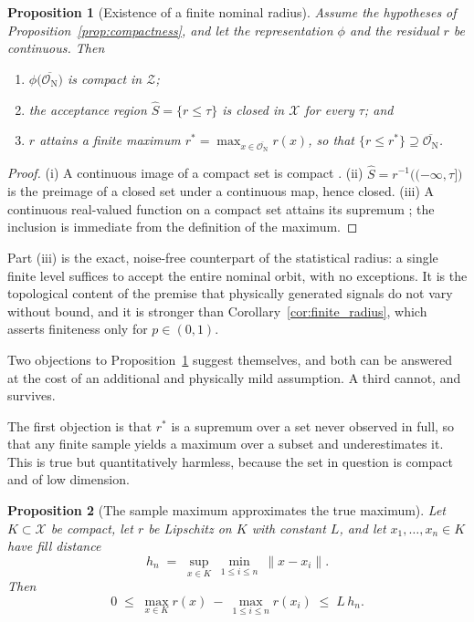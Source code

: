 \documentclass[a4paper]{cas-sc}
\newtheorem{proposition}{Proposition}
\newcommand{\X}{\ensuremath{\mathcal{X}}}
\newcommand{\Z}{\ensuremath{\mathcal{Z}}}
\newcommand{\residual}{\ensuremath{r}}
\begin{document}
\begin{proposition}[Existence of a finite nominal radius]
\label{prop:finite_nominal_radius}
Assume the hypotheses of Proposition~\ref{prop:compactness}, and let the
representation \(\phi\) and the residual \(\residual\) be continuous. Then
\begin{enumerate}[label=(\roman*),leftmargin=1.8em]
\item \(\phi\bigl(\overline{\mathcal{O}_{\mathrm N}}\bigr)\) is compact in
      \(\Z\);
\item the acceptance region \(\widehat{S}=\{\residual\le\tau\}\) is closed in
      \(\X\) for every \(\tau\); and
\item \(\residual\) attains a finite maximum
      \(\residual^{*}=\max_{x\in\overline{\mathcal{O}_{\mathrm N}}}\residual(x)\),
      so that \(\{\residual\le\residual^{*}\}\supseteq
      \overline{\mathcal{O}_{\mathrm N}}\).
\end{enumerate}
\end{proposition}

\begin{proof}
(i) A continuous image of a compact set is compact
\citep[Thm.~4.14]{rudin1976}. (ii) \(\widehat{S}=\residual^{-1}
\bigl((-\infty,\tau]\bigr)\) is the preimage of a closed set under a
continuous map, hence closed. (iii) A continuous real-valued function on a
compact set attains its supremum \citep[Thm.~4.16]{rudin1976}; the inclusion
is immediate from the definition of the maximum.
\end{proof}

Part (iii) is the exact, noise-free counterpart of the statistical radius: a
single finite level suffices to accept the entire nominal orbit, with no
exceptions. It is the topological content of the premise that physically
generated signals do not vary without bound, and it is stronger than
Corollary~\ref{cor:finite_radius}, which asserts finiteness only for
\(p\in(0,1)\).

Two objections to Proposition~\ref{prop:finite_nominal_radius} suggest
themselves, and both can be answered at the cost of an additional and
physically mild assumption. A third cannot, and survives.

The first objection is that \(\residual^{*}\) is a supremum over a set never
observed in full, so that any finite sample yields a maximum over a subset and
underestimates it. This is true but quantitatively harmless, because the set
in question is compact and of low dimension.

\begin{proposition}[The sample maximum approximates the true maximum]
\label{prop:fill_distance}
Let \(K\subset\X\) be compact, let \(\residual\) be Lipschitz on \(K\) with
constant \(L\), and let \(x_1,\ldots,x_n\in K\) have fill distance
\begin{equation}
h_n \;=\; \sup_{x\in K}\ \min_{1\le i\le n}\ \lVert x-x_i\rVert .
\label{eq:fill_distance}
\end{equation}
Then
\begin{equation}
0 \;\le\; \max_{x\in K}\residual(x)\ -\ \max_{1\le i\le n}\residual(x_i)
  \;\le\; L\,h_n .
\label{eq:fill_bound}
\end{equation}
\end{proposition}
\end{document}
